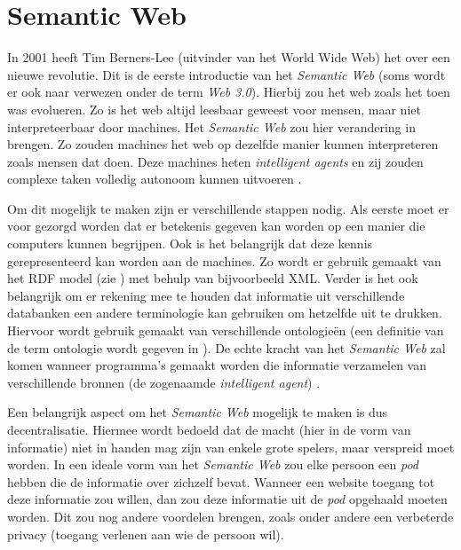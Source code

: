 \section{Semantic Web}
In 2001 heeft Tim Berners-Lee (uitvinder van het World Wide Web) het over een nieuwe revolutie. Dit is de eerste introductie van het \textit{Semantic Web} (soms wordt er ook naar verwezen onder de term \textit{Web 3.0}). Hierbij zou het web zoals het toen was evolueren. Zo is het web altijd leesbaar geweest voor mensen, maar niet interpreteerbaar door machines. Het \textit{Semantic Web} zou hier verandering in brengen. Zo zouden machines het web op dezelfde manier kunnen interpreteren zoals mensen dat doen. Deze machines heten \textit{intelligent agents} en zij zouden complexe taken volledig autonoom kunnen uitvoeren \cite{berners2001semantic}.

Om dit mogelijk te maken zijn er verschillende stappen nodig. Als eerste moet er voor gezorgd worden dat er betekenis gegeven kan worden op een manier die computers kunnen begrijpen. Ook is het belangrijk dat deze kennis gerepresenteerd kan worden aan de machines. Zo wordt er gebruik gemaakt van het RDF model (zie ) met behulp van bijvoorbeeld XML. Verder is het ook belangrijk om er rekening mee te houden dat informatie uit verschillende databanken een andere terminologie kan gebruiken om hetzelfde uit te drukken. Hiervoor wordt gebruik gemaakt van verschillende ontologieën (een definitie van de term ontologie wordt gegeven in ). De echte kracht van het \textit{Semantic Web} zal komen wanneer programma's gemaakt worden die informatie verzamelen van verschillende bronnen (de zogenaamde \textit{intelligent agent}) \cite{berners2001semantic}.

Een belangrijk aspect om het \textit{Semantic Web} mogelijk te maken is dus decentralisatie. Hiermee wordt bedoeld dat de macht (hier in de vorm van informatie) niet in handen mag zijn van enkele grote spelers, maar verspreid moet worden. In een ideale vorm van het \textit{Semantic Web} zou elke persoon een \textit{pod} hebben die de informatie over zichzelf bevat. Wanneer een website toegang tot deze informatie zou willen, dan zou deze informatie uit de \textit{pod} opgehaald moeten worden. Dit zou nog andere voordelen brengen, zoals onder andere een verbeterde privacy (toegang verlenen aan wie de persoon wil).

